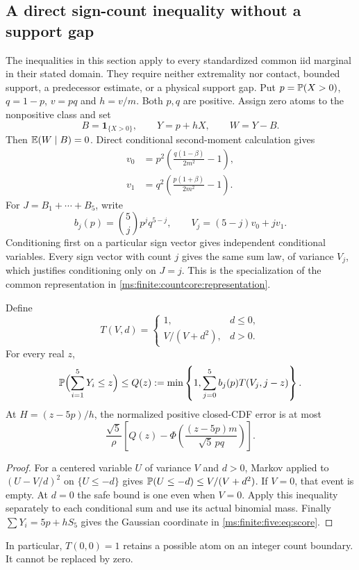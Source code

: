 \subsection{A direct sign-count inequality without a support gap}
\label{ms:finite:five:sec:gapfree}

The inequalities in this section apply to every standardized common iid
marginal in their stated domain. They require neither extremality nor
contact, bounded support, a predecessor estimate, or a physical support gap.
Put $p=\mathbb P(X>0)$, $q=1-p$, $v=pq$ and $h=v/m$.
Both $p,q$ are positive. Assign zero atoms to the nonpositive class and set
\[
 B=\mathbf 1_{\{X>0\}},\qquad Y=p+hX,\qquad W=Y-B.
\]
Then $\mathbb E(W\mid B)=0$. Direct conditional second-moment calculation gives
\begin{align}
 v_0&=p^2\left(\frac{q(1-\beta)}{2m^2}-1\right),
       \label{ms:finite:five:eq:v0}\\
 v_1&=q^2\left(\frac{p(1+\beta)}{2m^2}-1\right).
       \label{ms:finite:five:eq:v1}
\end{align}
For $J=B_1+\cdots+B_5$, write
\[
 b_j(p)=\binom5j p^jq^{5-j},\qquad
 V_j=(5-j)v_0+jv_1.
\]
Conditioning first on a particular sign vector gives independent
conditional variables. Every sign vector with count $j$ gives the same
sum law, of variance $V_j$, which justifies conditioning only on $J=j$.
This is the specialization of the common representation in
\eqref{ms:finite:countcore:representation}.

\begin{lemma}\label{ms:finite:five:lem:cantelli}
Define
\[
 T(V,d)=\begin{cases}1,&d\le0,\\ V/(V+d^2),&d>0.\end{cases}
\]
For every real $z$,
\begin{equation}\label{ms:finite:five:eq:count}
 \mathbb P\Bigl(\sum_{i=1}^5Y_i\le z\Bigr)
 \le Q(z):=\min\left\{1,\sum_{j=0}^5b_j(p)T(V_j,j-z)\right\}.
\end{equation}
At $H=(z-5p)/h$, the normalized positive closed-CDF error is at most
\begin{equation}\label{ms:finite:five:eq:score}
 \frac{\sqrt5}{\rho}
 \left[Q(z)-\Phi\left(\frac{(z-5p)m}{\sqrt5\,pq}\right)\right].
\end{equation}
\end{lemma}
\begin{proof}
For a centered variable $U$ of variance $V$ and $d>0$, Markov applied to
$(U-V/d)^2$ on $\{U\le-d\}$ gives
$\mathbb P(U\le-d)\le V/(V+d^2)$. If $V=0$, that event is empty.
At $d=0$ the safe bound is one even when $V=0$. Apply this inequality
separately to each conditional sum and use its actual binomial mass.
Finally $\sum Y_i=5p+hS_5$ gives the Gaussian coordinate in
\eqref{ms:finite:five:eq:score}.
\end{proof}
In particular, $T(0,0)=1$ retains a possible atom on an integer count
boundary. It cannot be replaced by zero.

